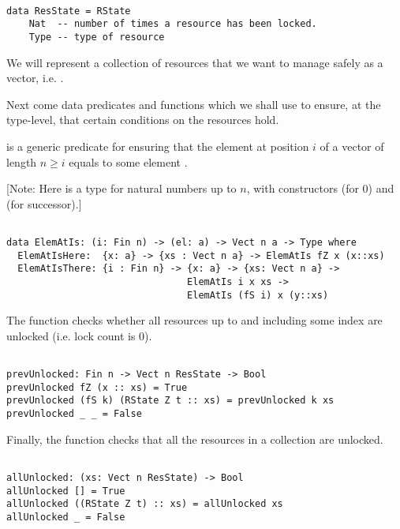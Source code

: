 \begin{BVerbatim}

data ResState = RState
    Nat  -- number of times a resource has been locked.
    Type -- type of resource

\end{BVerbatim}

We will represent a collection of resources that we want to manage safely as a
vector, i.e. .

Next come data predicates and functions which we shall use to ensure, at the
type-level, that certain conditions on the resources hold.

 is a generic predicate for ensuring that the element at
position $i$ of a vector of length $n \geq i$ equals to some element .

[Note: Here  is a type for natural numbers up to $n$, with constructors
 (for $0$) and  (for successor).]

\begin{BVerbatim}

data ElemAtIs: (i: Fin n) -> (el: a) -> Vect n a -> Type where
  ElemAtIsHere:  {x: a} -> {xs : Vect n a} -> ElemAtIs fZ x (x::xs)
  ElemAtIsThere: {i : Fin n} -> {x: a} -> {xs: Vect n a} ->
                                ElemAtIs i x xs ->
                                ElemAtIs (fS i) x (y::xs)

\end{BVerbatim}

The  function checks whether all resources up to and
including some index are unlocked (i.e. lock count is 0).

\begin{BVerbatim}

prevUnlocked: Fin n -> Vect n ResState -> Bool
prevUnlocked fZ (x :: xs) = True
prevUnlocked (fS k) (RState Z t :: xs) = prevUnlocked k xs
prevUnlocked _ _ = False

\end{BVerbatim}

Finally, the  function checks that all the resources in a
collection are unlocked.

\begin{BVerbatim}

allUnlocked: (xs: Vect n ResState) -> Bool
allUnlocked [] = True
allUnlocked ((RState Z t) :: xs) = allUnlocked xs
allUnlocked _ = False

\end{BVerbatim}

